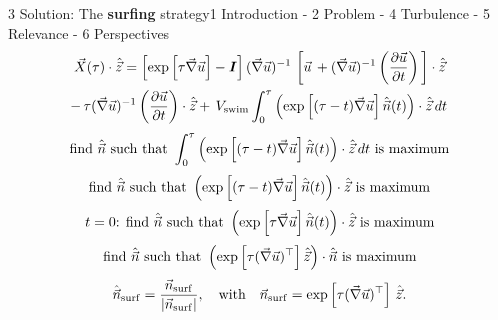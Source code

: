 \begin{frame}{3 Solution: The \textbf{surfing} strategy}{1 Introduction - 2 Problem - 4 Turbulence - 5 Relevance - 6 Perspectives}
	\centering
	\vspace{-15pt}
	\begin{multline*}
		\vec{X}(\tau) \cdot \hat{\vec{z}} =
		\left[ \exp \left[ \tau \vec{\nabla} \vec{u} \right] - \boldsymbol{I} \right] (\vec{\nabla} \vec{u})^{-1} \, \left[ \vec{u} \, + (\vec{\nabla} \vec{u})^{-1} \left(\frac{\partial \vec{u}}{\partial t} \right) \, \right] \cdot \hat{\vec{z}} \\
		- \, \tau (\vec{\nabla} \vec{u})^{-1} \left(\frac{\partial \vec{u}}{\partial t} \right) \cdot \hat{\vec{z}}
		+ \, V_{\mathrm{swim}} \int_{0}^{\tau} \left( \exp \left[ (\tau - t) \vec{\nabla} \vec{u} \right] \hat{\vec{n}}(t) \right) \cdot \hat{\vec{z}} \, dt \,
	\end{multline*}
	\vspace{2pt}
	\pause
	\begin{equation*}
		\text{find} ~ \hat{\vec{n}} ~ \text{such that} ~ \int_{0}^{\tau} \left( \exp \left[ (\tau - t) \vec{\nabla} \vec{u} \right] \hat{\vec{n}}(t) \right) \cdot \hat{\vec{z}} \, dt ~ \text{is maximum}
	\end{equation*}
	\pause
	\begin{equation*}
		\text{find} ~ \hat{\vec{n}} ~ \text{such that} ~ \left( \exp \left[ (\tau - t) \vec{\nabla} \vec{u} \right] \hat{\vec{n}}(t) \right) \cdot \hat{\vec{z}} ~ \text{is maximum}
	\end{equation*}
	\pause
	\begin{equation*}
		\text{$t=0$: find} ~ \hat{\vec{n}} ~ \text{such that} ~ \left( \exp \left[ \tau \vec{\nabla} \vec{u} \right] \hat{\vec{n}}(t) \right) \cdot \hat{\vec{z}} ~ \text{is maximum}
	\end{equation*}
	\pause
	\begin{equation*}
		\text{find} ~ \hat{\vec{n}} ~ \text{such that} ~ \left( \exp \left[ \tau (\vec{\nabla} \vec{u})^\top \right] \hat{\vec{z}} \right) \cdot \hat{\vec{n}} ~ \text{is maximum}
	\end{equation*}
	\pause
	\begin{equation*}
		\hat{\vec{n}}_{\mathrm{surf}} = \frac{\vec{n}_{\mathrm{surf}}}{\lvert\vec{n}_{\mathrm{surf}}\rvert}, \quad \text{with} \quad \vec{n}_{\mathrm{surf}} = \exp \left[ \tau (\vec{\nabla} \vec{u})^\top \right] \, \hat{\vec{z}}.
	\end{equation*}
\end{frame}


